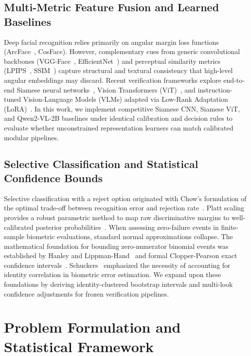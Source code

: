 \documentclass[10pt,journal,compsoc]{IEEEtran}
\begin{document}
\subsection{Multi-Metric Feature Fusion and Learned Baselines}
Deep facial recognition relies primarily on angular margin loss functions (ArcFace~\cite{deng2019arcface}, CosFace). However, complementary cues from generic convolutional backbones (VGG-Face~\cite{parkhi2015vgg}, EfficientNet~\cite{tan2019efficientnet}) and perceptual similarity metrics (LPIPS~\cite{zhang2018lpips}, SSIM~\cite{wang2004ssim}) capture structural and textural consistency that high-level angular embeddings may discard. Recent verification frameworks explore end-to-end Siamese neural networks~\cite{chopra2005siamese,koch2015siamese}, Vision Transformers (ViT)~\cite{dosovitskiy2021vit}, and instruction-tuned Vision-Language Models (VLMs) adapted via Low-Rank Adaptation (LoRA)~\cite{hu2022lora,wang2024qwen2vl}. In this work, we implement competitive Siamese CNN, Siamese ViT, and Qwen2-VL-2B baselines under identical calibration and decision rules to evaluate whether unconstrained representation learners can match calibrated modular pipelines.

\subsection{Selective Classification and Statistical Confidence Bounds}
Selective classification with a reject option originated with Chow's formulation of the optimal trade-off between recognition error and rejection rate~\cite{chow1970reject}. Platt scaling provides a robust parametric method to map raw discriminative margins to well-calibrated posterior probabilities~\cite{platt1999}. When assessing zero-failure events in finite-sample biometric evaluations, standard normal approximations collapse. The mathematical foundation for bounding zero-numerator binomial events was established by Hanley and Lippman-Hand~\cite{hanley1983rule3} and formal Clopper-Pearson exact confidence intervals~\cite{clopper1934}. Schuckers~\cite{schuckers2001} emphasized the necessity of accounting for identity correlation in biometric error estimation. We expand upon these foundations by deriving identity-clustered bootstrap intervals and multi-look confidence adjustments for frozen verification pipelines.

\section{Problem Formulation and Statistical Framework}
\label{sec:formulation}
\end{document}
